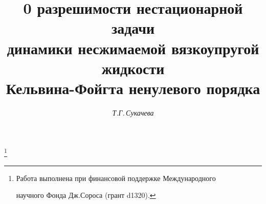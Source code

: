 











\newcommand{\im}{\operatorname{im}}


\newcommand{\coim}{\operatorname{coim}}




\newcommand{\bo}{\Bbb O}


\newcommand{\bh}{\bold H}


\newcommand{\nts}{\negthickspace}


\newcommand{\tts}[1]{}










\setcounter{page}{47}












\author{\it Т.Г.\,Сукачева}




\title{0 разрешимости нестационарной задачи \\


динамики несжимаемой вязкоупругой жидкости\\


Кельвина-Фойгта ненулевого порядка}





\thanks{Работа выполнена при финансовой поддержке Международного


научного Фонда Дж.Сороса (грант d1320).}


